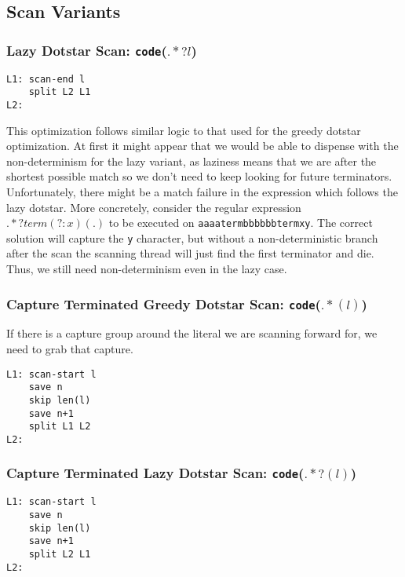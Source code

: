 \subsection{Scan Variants}

\subsubsection{Lazy Dotstar Scan: {\tt code}($.*?l$)}

\begin{verbatim}
L1: scan-end l
    split L2 L1
L2: 
\end{verbatim}

This optimization follows similar logic to that used for the greedy
dotstar optimization. At first it might appear that we would be able
to dispense with the non-determinism for the lazy variant, as laziness
means that we are after the shortest possible match so we don't
need to keep looking for future terminators. Unfortunately, there
might be a match failure in the expression which follows the lazy
dotstar. More concretely, consider the regular expression $.*?term(?:x)(.)$
to be executed on \verb'aaaatermbbbbbbtermxy'. The correct solution will
capture the \verb'y' character, but without a non-deterministic branch
after the scan the scanning thread will just find the first terminator and
die. Thus, we still need non-determinism even in the lazy case.

\subsubsection{Capture Terminated Greedy Dotstar Scan: {\tt code}($.*(l)$)}
  \label{capterm}

If there is a capture group around the literal we are scanning forward
for, we need to grab that capture.

\begin{verbatim}
L1: scan-start l
    save n
    skip len(l)
    save n+1
    split L1 L2
L2: 
\end{verbatim}

\subsubsection{Capture Terminated Lazy Dotstar Scan: {\tt code}($.*?(l)$)}

\begin{verbatim}
L1: scan-start l
    save n
    skip len(l)
    save n+1
    split L2 L1
L2: 
\end{verbatim}

